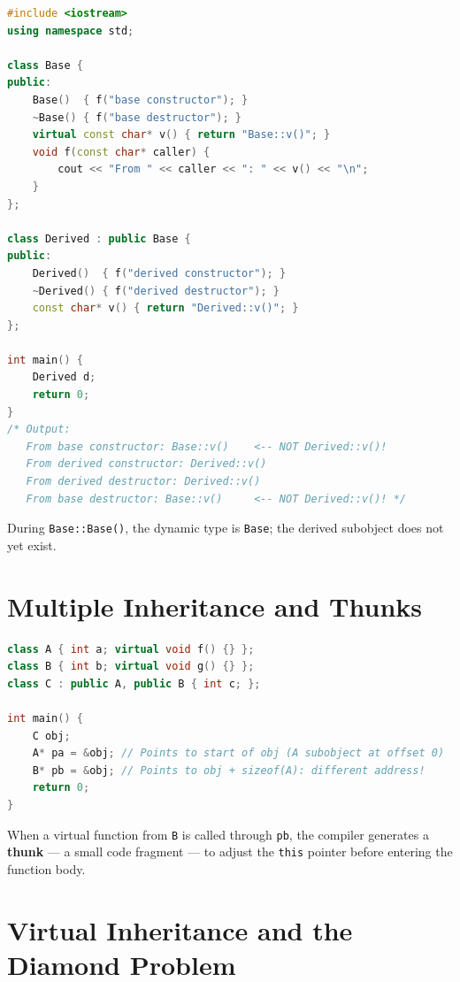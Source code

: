 \begin{lstlisting}[language=C++, caption={Virtual call during construction does not dispatch to derived}]
#include <iostream>
using namespace std;

class Base {
public:
    Base()  { f("base constructor"); }
    ~Base() { f("base destructor"); }
    virtual const char* v() { return "Base::v()"; }
    void f(const char* caller) {
        cout << "From " << caller << ": " << v() << "\n";
    }
};

class Derived : public Base {
public:
    Derived()  { f("derived constructor"); }
    ~Derived() { f("derived destructor"); }
    const char* v() { return "Derived::v()"; }
};

int main() {
    Derived d;
    return 0;
}
/* Output:
   From base constructor: Base::v()    <-- NOT Derived::v()!
   From derived constructor: Derived::v()
   From derived destructor: Derived::v()
   From base destructor: Base::v()     <-- NOT Derived::v()! */
\end{lstlisting}

During \texttt{Base::Base()}, the dynamic type is \texttt{Base}; the derived subobject does not yet exist.

\section{Multiple Inheritance and Thunks}
\label{sec:multiple-inheritance}

\begin{lstlisting}[language=C++, caption={Multiple inheritance and subobject layout}]
class A { int a; virtual void f() {} };
class B { int b; virtual void g() {} };
class C : public A, public B { int c; };

int main() {
    C obj;
    A* pa = &obj; // Points to start of obj (A subobject at offset 0)
    B* pb = &obj; // Points to obj + sizeof(A): different address!
    return 0;
}
\end{lstlisting}

When a virtual function from \texttt{B} is called through \texttt{pb}, the compiler generates a \textbf{thunk} --- a small code fragment --- to adjust the \texttt{this} pointer before entering the function body.

\section{Virtual Inheritance and the Diamond Problem}
\label{sec:diamond-problem}

